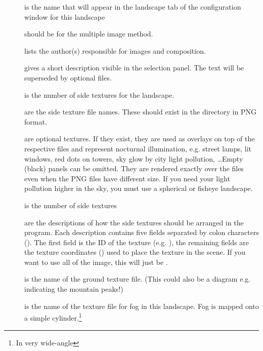 \begin{description}
\item[] is the name that will appear in the landscape tab of the configuration window for this landscape
\item[] should be  for the multiple image method.
\item[] lists the author(s) responsible for images and composition.
\item[] gives a short description visible in the
  selection panel. The text will be superseded by optional
   files.
\item[] is the number of side textures for the landscape.
\item[] are the side texture file
  names. These should exist in the  directory in PNG format.
\item[] are optional textures. If
  they exist, they are used as overlays on top of the respective
   files and represent nocturnal illumination,
  e.g. street lamps, lit windows, red dots on towers, sky glow by city
  light pollution, \ldots Empty (black) panels can be omitted. They
  are rendered exactly over the  files even when the PNG
  files have different size. If you need your light pollution higher in
  the sky, you must use a spherical or fisheye
  landscape.
\item[] is the number of side textures
\item[] are the descriptions of how
  the side textures should be arranged in the program. Each
  description contains five fields separated by colon characters
  (\var{:}). The first field is the ID of the texture
  (e.g. ), the remaining fields are the texture coordinates
  () used to place the texture in the scene. If you
  want to use all of the image, this will just be .
\item[] is the name of the ground texture file. (This
  could also be a diagram e.g. indicating the mountain peaks!)
\item[] is the name of the texture file for fog in this
  landscape. Fog is mapped onto a simple cylinder.\footnote{In very wide-angle
}
\end{description}
